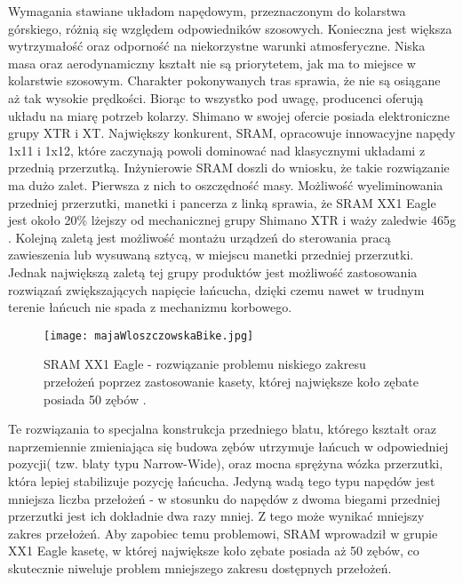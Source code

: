 Wymagania stawiane układom napędowym, przeznaczonym do kolarstwa górskiego, różnią się względem odpowiedników szosowych. Konieczna jest większa wytrzymałość oraz odporność na niekorzystne warunki atmosferyczne. Niska masa oraz aerodynamiczny kształt nie są priorytetem, jak ma to miejsce w kolarstwie szosowym. Charakter pokonywanych tras sprawia, że nie są osiągane aż tak wysokie prędkości. Biorąc to wszystko pod uwagę, producenci oferują układu na miarę potrzeb kolarzy. Shimano w swojej ofercie posiada elektroniczne grupy XTR i XT. Największy konkurent, SRAM, opracowuje innowacyjne napędy 1x11 i 1x12, które zaczynają powoli dominować nad klasycznymi układami z przednią przerzutką. Inżynierowie SRAM doszli do wniosku, że takie rozwiązanie ma dużo zalet. Pierwsza z nich to oszczędność masy. Możliwość wyeliminowania przedniej przerzutki, manetki i pancerza z linką sprawia, że SRAM XX1 Eagle jest około 20\% lżejszy od mechanicznej grupy Shimano XTR i waży zaledwie 465g \cite{sramEagle}\cite{shimanoXtr}. Kolejną zaletą jest możliwość montażu urządzeń do sterowania pracą zawieszenia lub wysuwaną sztycą, w miejscu manetki przedniej przerzutki. Jednak największą zaletą tej grupy produktów jest możliwość zastosowania rozwiązań zwiększających napięcie łańcucha, dzięki czemu nawet w trudnym terenie łańcuch nie spada z mechanizmu korbowego.
\begin{figure}[h]
    \centering
    \texttt{[image: majaWloszczowskaBike.jpg]}
    \caption{SRAM XX1 Eagle - rozwiązanie problemu niskiego zakresu przełożeń poprzez zastosowanie kasety, której największe koło zębate posiada 50 zębów \cite{majaBike}.}
    \label{fig:majkaBike}
\end{figure}
Te rozwiązania to specjalna konstrukcja przedniego blatu, którego kształt oraz naprzemiennie zmieniająca się budowa zębów utrzymuje łańcuch w odpowiedniej pozycji( tzw. blaty typu Narrow-Wide), oraz mocna sprężyna wózka przerzutki, która lepiej stabilizuje pozycję łańcucha. Jedyną wadą tego typu napędów jest mniejsza liczba przełożeń - w stosunku do napędów z dwoma biegami przedniej przerzutki jest ich dokładnie dwa razy mniej. Z tego może wynikać mniejszy zakres przełożeń. Aby zapobiec temu problemowi, SRAM wprowadził w grupie XX1 Eagle kasetę, w której największe koło zębate posiada aż 50 zębów, co skutecznie niweluje problem mniejszego zakresu dostępnych przełożeń.




